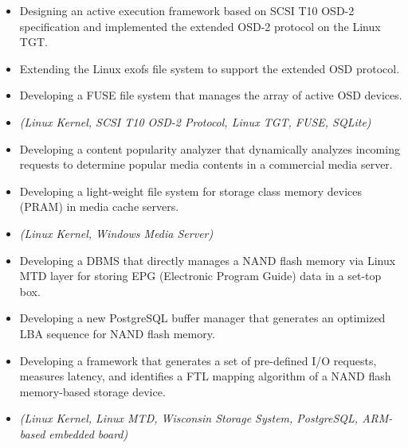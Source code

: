\begin{itemize}
 \item {Designing an active execution framework based on SCSI T10 OSD-2
       specification and implemented the extended OSD-2 protocol on the Linux TGT.}
 \item {Extending the Linux exofs file system to support the extended OSD protocol.}
 \item {Developing a FUSE file system that manages the array of active OSD devices.}
 \item {\it\small(Linux Kernel, SCSI T10 OSD-2 Protocol, Linux TGT, FUSE, SQLite)}
\end{itemize}

\begin{itemize}
 \item {Developing a content popularity analyzer that dynamically analyzes incoming requests to determine
 popular media contents in a commercial media server.}
 \item{Developing a light-weight file system for storage class memory devices (PRAM) in media cache servers.}
 \item{\it\small(Linux Kernel, Windows Media Server)}
\end{itemize}

\begin{itemize}
\item{Developing a DBMS that directly manages a NAND flash
         memory via Linux MTD layer for storing EPG (Electronic Program Guide) data in a set-top box.}
\item{Developing a new PostgreSQL buffer manager
         that generates an optimized LBA sequence for NAND flash memory.}
\item{Developing a framework that generates a set of pre-defined I/O
	 requests, measures latency, and identifies a FTL mapping algorithm of a NAND flash memory-based storage device.}

\item{\it\small(Linux Kernel, Linux MTD, Wisconsin Storage System, PostgreSQL,
             ARM-based embedded board)}
\end{itemize}

